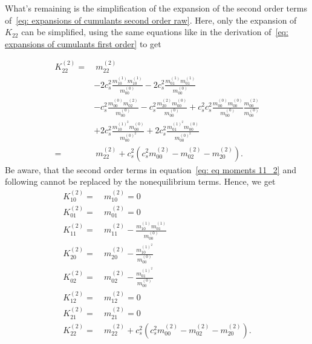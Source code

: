 What's remaining is the simplification of the expansion of the second order terms of~\eqref{eq: expansions of cumulants second order raw}.
Here, only the expansion of $K_{22}$ can be simplified, using the same equations like in the derivation of~\eqref{eq: expansions of cumulants first order} to get

\begin{equation*}
  \begin{aligned}
    K_{22}^{(2)}
    = &\
    m_{22}^{(2)}
    \\&
    - 2 c_s^2 \frac{ m_{10}^{(1)} m_{10}^{(1)} }{m_{00}^{(0)}}
    - 2 c_s^2 \frac{ m_{01}^{(1)} m_{01}^{(1)} }{m_{00}^{(0)}}
    \\&
    - c_s^2\frac{  m_{00}^{(0)} m_{02}^{(2)} }{m_{00}^{(0)}}
    - c_s^2\frac{  m_{20}^{(2)} m_{00}^{(0)} }{m_{00}^{(0)}}
    + c_s^2 c_s^2 \frac{ m_{00}^{(0)} m_{00}^{(0)} }{m_{00}^{(0)}}\frac{ m_{00}^{(2)} }{m_{00}^{(0)}}
    \\&
    + 2 c_s^2 \frac{ m_{10}^{{(1)}^2} m_{00}^{(0)} }{m_{00}^{{(0)}^2}}
    + 2 c_s^2 \frac{ m_{01}^{{(1)}^2} m_{00}^{(0)} }{m_{00}^{{(0)}^2}}
    \\= &\
    m_{22}^{(2)}
    + c_s^2\left(c_s^2 m_{00}^{(2)}
    - m_{02}^{(2)}
    - m_{20}^{(2)}
    \right).
  \end{aligned}
\end{equation*}
Be aware, that the second order terms in equation~\eqref{eq: eq moments 11_2} and following cannot be replaced by the nonequilibrium terms.
Hence, we get
\begin{equation}
  \label{eq: expansions of cumulants second order}
  \begin{aligned}
    K_{10}^{(2)} =&\ m_{10}^{(2)} = 0\\
    K_{01}^{(2)} =&\ m_{01}^{(2)} = 0\\
    K_{11}^{(2)} =&\ m_{11}^{(2)} - \frac{ m_{10}^{(1)}m_{01}^{(1)}}{m_{00}^{(0)}} \\
    K_{20}^{(2)} =&\ m_{20}^{(2)} - \frac{ m_{10}^{{(1)}^2}}{m_{00}^{(0)}} \\
    K_{02}^{(2)} =&\ m_{02}^{(2)} - \frac{ m_{01}^{{(1)}^2}}{m_{00}^{(0)}} \\
    K_{12}^{(2)} =&\ m_{12}^{(2)} = 0\\
    K_{21}^{(2)} =&\ m_{21}^{(2)} = 0\\
    K_{22}^{(2)} =&\
    m_{22}^{(2)}
    + c_s^2\left(c_s^2 m_{00}^{(2)}
    - m_{02}^{(2)}
    - m_{20}^{(2)}
    \right).
  \end{aligned}
\end{equation}

